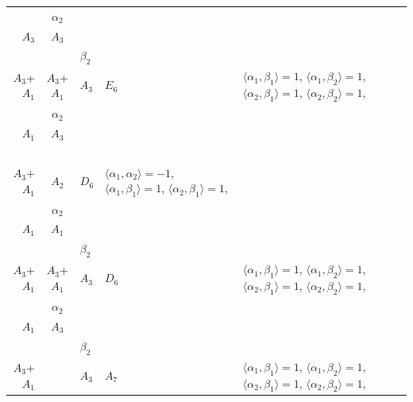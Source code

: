 \documentclass[12pt]{report}
\begin{document}
\begin{appendix}
{\begin{longtable}{rcl p{1cm}p{1cm}p{3cm} }
\\
\begin{tabular}{cc}$\alpha_1$+ & $\alpha_2$\\\tiny{ $A_3$ } & \tiny{ $A_3$ }\end{tabular} &\begin{tabular}{c} = \\~ \end{tabular} & \begin{tabular}{cc}$\beta_1$+ & $\beta_2$\\\tiny{ $A_3$+$A_1$ } & \tiny{ $A_3$+$A_1$ }\end{tabular} & $A_3$ & $E_6$ &  $\langle\alpha_1, \beta_1\rangle=1$, $\langle\alpha_1, \beta_2\rangle=1$, $\langle\alpha_2, \beta_1\rangle=1$, $\langle\alpha_2, \beta_2\rangle=1$, 
\\
\begin{tabular}{cc}$\alpha_1$+ & $\alpha_2$\\\tiny{ $A_1$ } & \tiny{ $A_3$ }\end{tabular} &\begin{tabular}{c} = \\~ \end{tabular} & \begin{tabular}{c}$\beta_1$\\\tiny{ $A_3$+$A_1$ }\end{tabular} & $A_2$ & $D_6$ & $\langle\alpha_1, \alpha_2\rangle=-1$,  $\langle\alpha_1, \beta_1\rangle=1$, $\langle\alpha_2, \beta_1\rangle=1$, 
\\
\begin{tabular}{cc}$\alpha_1$+ & $\alpha_2$\\\tiny{ $A_1$ } & \tiny{ $A_1$ }\end{tabular} &\begin{tabular}{c} = \\~ \end{tabular} & \begin{tabular}{cc}$\beta_1$+ & $\beta_2$\\\tiny{ $A_3$+$A_1$ } & \tiny{ $A_3$+$A_1$ }\end{tabular} & $A_3$ & $D_6$ &  $\langle\alpha_1, \beta_1\rangle=1$, $\langle\alpha_1, \beta_2\rangle=1$, $\langle\alpha_2, \beta_1\rangle=1$, $\langle\alpha_2, \beta_2\rangle=1$, 
\\
\begin{tabular}{cc}$\alpha_1$+ & $\alpha_2$\\\tiny{ $A_1$ } & \tiny{ $A_3$ }\end{tabular} &\begin{tabular}{c} = \\~ \end{tabular} & \begin{tabular}{cc}$\beta_1$+ & $\beta_2$\\\tiny{ $A_3$+$A_1$ } & \tiny{  }\end{tabular} & $A_3$ & $A_7$ &  $\langle\alpha_1, \beta_1\rangle=1$, $\langle\alpha_1, \beta_2\rangle=1$, $\langle\alpha_2, \beta_1\rangle=1$, $\langle\alpha_2, \beta_2\rangle=1$, 

\end{longtable}}
\end{appendix}
\end{document}

